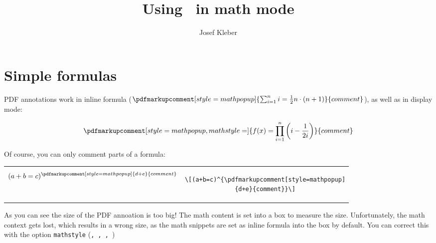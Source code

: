 \documentclass[pagesize,11pt,leqno]{scrartcl}
\begin{document}
\setlength{\parindent}{0pt}
\author{Josef Kleber}
\title{Using \texttt{\string\pdfmarkupcomment}\ in math mode}
%
\maketitle
\section{Simple formulas}
PDF annotations work in inline formula ($\pdfmarkupcomment[style=mathpopup]{\sum_{i=1}^{n}i=\frac{1}{2}n\cdot(n+1)}{comment}$), as well as in display mode:

\[\pdfmarkupcomment[style=mathpopup,mathstyle=\displaystyle]{f(x)=\prod_{i=1}^{n}\left(i-\frac{1}{2i}\right)}{comment}\]

\bigskip
Of course, you can only comment parts of a formula:

\bigskip
\begin{tabular}{cc}
\begin{minipage}{0.26\linewidth}
\[(a+b=c)^{\pdfmarkupcomment[style=mathpopup]{d+e}{comment}}\]
\end{minipage} &
\begin{minipage}{0.68\linewidth}
\begin{lstlisting}
\[(a+b=c)^{\pdfmarkupcomment[style=mathpopup]
{d+e}{comment}}\]
\end{lstlisting}
\end{minipage}
\end{tabular}

\bigskip
As you can see the size of the PDF annoation is too big! The math content is set into a box to measure the size. Unfortunately, the math context gets lost, which results in a wrong size, as the math snippets are set as inline formula into the box by default. You can correct this with the option \texttt{mathstyle} (\texttt{\string\textstyle, \string\displaystyle, \string\scriptstyle, \string\scriptscriptstyle}) 
\end{document}
